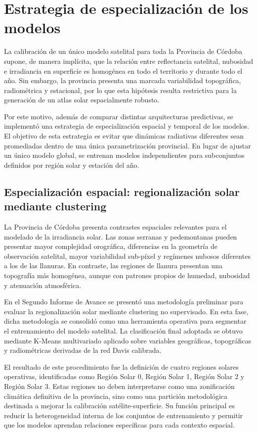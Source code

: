 \documentclass[../main.tex]{subfiles}
\begin{document}
    
\section{Estrategia de especialización de los modelos}

La calibración de un único modelo satelital para toda la Provincia de Córdoba supone, de manera implícita, que la relación entre reflectancia satelital, nubosidad e irradiancia en superficie es homogénea en todo el territorio y durante todo el año. Sin embargo, la provincia presenta una marcada variabilidad topográfica, radiométrica y estacional, por lo que esta hipótesis resulta restrictiva para la generación de un atlas solar espacialmente robusto.

Por este motivo, además de comparar distintas arquitecturas predictivas, se implementó una estrategia de especialización espacial y temporal de los modelos. El objetivo de esta estrategia es evitar que dinámicas radiativas diferentes sean promediadas dentro de una única parametrización provincial. En lugar de ajustar un único modelo global, se entrenan modelos independientes para subconjuntos definidos por región solar y estación del año.

\subsection{Especialización espacial: regionalización solar mediante clustering}

La Provincia de Córdoba presenta contrastes espaciales relevantes para el modelado de la irradiancia solar. Las zonas serranas y pedemontanas pueden presentar mayor complejidad orográfica, diferencias en la geometría de observación satelital, mayor variabilidad sub-píxel y regímenes nubosos diferentes a los de las llanuras. En contraste, las regiones de llanura presentan una topografía más homogénea, aunque con patrones propios de humedad, nubosidad y atenuación atmosférica.

En el Segundo Informe de Avance se presentó una metodología preliminar para evaluar la regionalización solar mediante clustering no supervisado. En esta fase, dicha metodología se consolidó como una herramienta operativa para segmentar el entrenamiento del modelo satelital. La clasificación final adoptada se obtuvo mediante K-Means multivariado aplicado sobre variables geográficas, topográficas y radiométricas derivadas de la red Davis calibrada.

El resultado de este procedimiento fue la definición de cuatro regiones solares operativas, identificadas como Región Solar 0, Región Solar 1, Región Solar 2 y Región Solar 3. Estas regiones no deben interpretarse como una zonificación climática definitiva de la provincia, sino como una partición metodológica destinada a mejorar la calibración satélite-superficie. Su función principal es reducir la heterogeneidad interna de los conjuntos de entrenamiento y permitir que los modelos aprendan relaciones específicas para cada contexto espacial.
\end{document}
